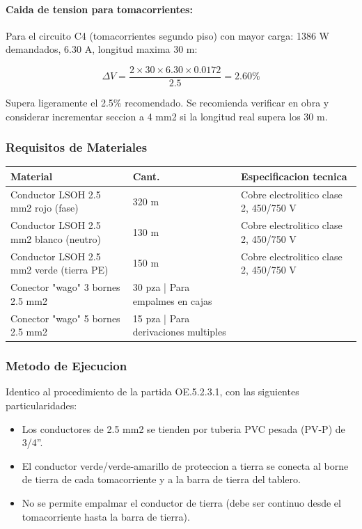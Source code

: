 \paragraph{Caida de tension para tomacorrientes:}
Para el circuito C4 (tomacorrientes segundo piso) con mayor carga: 1386 W demandados, 6.30 A, longitud maxima 30 m:

\begin{equation}
\Delta V = \frac{2 \times 30 \times 6.30 \times 0.0172}{2.5} = 2.60\%
\end{equation}

Supera ligeramente el 2.5\% recomendado. Se recomienda verificar en obra y considerar incrementar seccion a 4 mm2 si la longitud real supera los 30 m.

\subsubsection{Requisitos de Materiales}

\begin{longtable}{L{5.0cm} L{2.0cm} L{7.5cm}}
\toprule
\textbf{Material} & \textbf{Cant.} & \textbf{Especificacion tecnica} \\
\midrule
Conductor LSOH 2.5 mm2 rojo (fase) & 320 m & Cobre electrolitico clase 2, 450/750 V \\
Conductor LSOH 2.5 mm2 blanco (neutro) & 130 m & Cobre electrolitico clase 2, 450/750 V \\
Conductor LSOH 2.5 mm2 verde (tierra PE) & 150 m & Cobre electrolitico clase 2, 450/750 V \\
Conector "wago" 3 bornes 2.5 mm2 & 30 pza | Para empalmes en cajas \\
Conector "wago" 5 bornes 2.5 mm2 & 15 pza | Para derivaciones multiples \\
\bottomrule
\end{longtable}

\subsubsection{Metodo de Ejecucion}

Identico al procedimiento de la partida OE.5.2.3.1, con las siguientes particularidades:
\begin{itemize}
  \item Los conductores de 2.5 mm2 se tienden por tuberia PVC pesada (PV-P) de 3/4''.
  \item El conductor verde/verde-amarillo de proteccion a tierra se conecta al borne de tierra de cada tomacorriente y a la barra de tierra del tablero.
  \item No se permite empalmar el conductor de tierra (debe ser continuo desde el tomacorriente hasta la barra de tierra).
\end{itemize}

